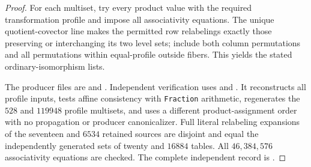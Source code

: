 \begin{proof}
For each multiset, try every product value with the required
transformation profile and impose all associativity equations.
The unique quotient-covector line makes the permitted row relabelings
exactly those preserving or interchanging its two level sets; include
both column permutations and all permutations within equal-profile
outside fibers.  This yields the stated ordinary-isomorphism lists.

The producer files are  and
.  Independent verification uses
 and
.
It reconstructs all profile inputs, tests affine consistency with
\texttt{Fraction} arithmetic, regenerates the $528$ and $119948$
profile multisets, and uses a different product-assignment order with
no propagation or producer canonicalizer.  Full literal relabeling
expansions of the seventeen and $6534$ retained sources are disjoint
and equal the independently generated sets of twenty and $16884$
tables.  All $46{,}384{,}576$ associativity equations are checked.
The complete independent record is
.
\end{proof}

